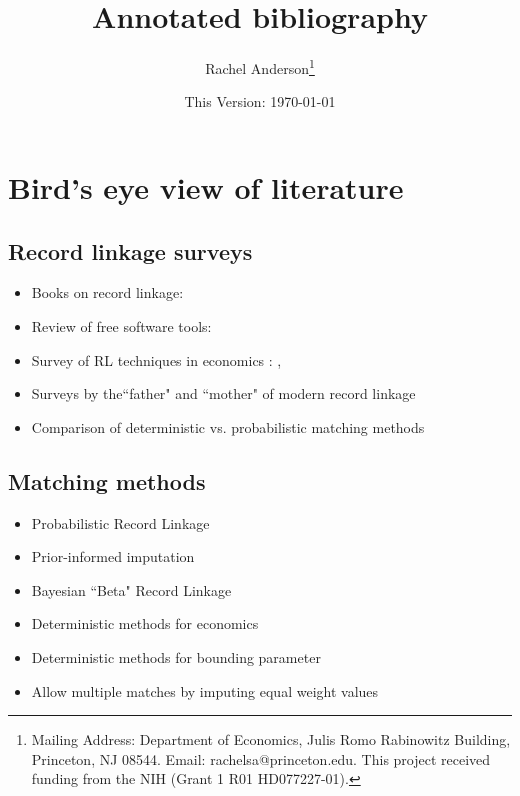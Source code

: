 \documentclass[12pt]{article}
\title{\singlespacing Annotated bibliography}
\author{\singlespacing \vspace{-50pt} Rachel Anderson\thanks{Mailing Address: Department of Economics, Julis Romo Rabinowitz Building, Princeton, NJ 08544. Email: rachelsa@princeton.edu. This project received funding from the NIH (Grant 1 R01 HD077227-01). }}
\date{\vspace{-40pt} This Version: \today}
\begin{document}
\singlespacing
\section*{Bird's eye view of literature}
\subsection*{Record linkage surveys}
\begin{itemize}
\item Books on record linkage: \cite{christen2012, herzog07, harron_book}
\item Review of free software tools: \cite{kopcke2010}
\item Survey of RL techniques in economics : \cite{bailey2017}, \cite{abe2019} 
\item Surveys by the``father" and ``mother" of modern record linkage \citep{winkler99} 
\item Comparison of deterministic vs. probabilistic matching methods \citep{harron2018}
\end{itemize}
\subsection*{Matching methods}
\begin{itemize}
\item Probabilistic Record Linkage \citep{fellegi69, arp2018}
\item Prior-informed imputation \citep{Goldstein2012} 
\item Bayesian ``Beta" Record Linkage \citep{sadinle2017} 
\item Deterministic methods for economics  \citep{ferrie96, abe2012, abe2017}
\item Deterministic methods for bounding parameter \citep{nq2015}
\item Allow multiple matches by imputing equal weight values \citep{bleakley2016}


\end{itemize}
\end{document}
